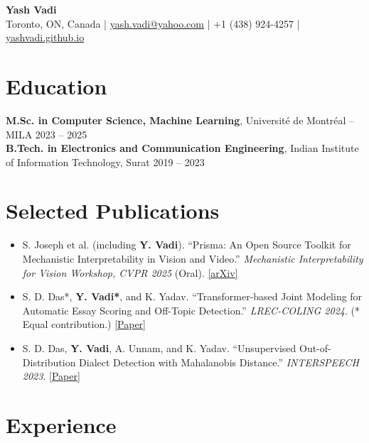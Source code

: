 \documentclass[letterpaper,10pt]{article}
\newcommand{\pub}[1]{\item\small #1}
\begin{document}
\small

\begin{center}
  {\LARGE\textbf{Yash Vadi}}\\[3pt]
  Toronto, ON, Canada \;|\;
  \href{mailto:yash.vadi@yahoo.com}{\textcolor{NavyBlue}{yash.vadi@yahoo.com}} \;|\;
  +1 (438) 924-4257 \;|\;
  \href{https://yashvadi.github.io/}{\textcolor{NavyBlue}{yashvadi.github.io}}
\end{center}
\vspace{-8pt}

\section{Education}
\textbf{M.Sc. in Computer Science, Machine Learning}, Universit\'e de Montr\'eal -- MILA \hfill 2023 -- 2025\\
\textbf{B.Tech. in Electronics and Communication Engineering}, Indian Institute of Information Technology, Surat \hfill 2019 -- 2023

\section{Selected Publications}
\begin{itemize}
  \pub{S. Joseph et al. (including \textbf{Y. Vadi}). ``Prisma: An Open Source Toolkit for Mechanistic Interpretability in Vision and Video.'' \textit{Mechanistic Interpretability for Vision Workshop, CVPR 2025} (Oral). \href{https://arxiv.org/abs/2504.19475}{[arXiv]}}
  \pub{S. D. Das*, \textbf{Y. Vadi*}, and K. Yadav. ``Transformer-based Joint Modeling for Automatic Essay Scoring and Off-Topic Detection.'' \textit{LREC-COLING 2024}. (* Equal contribution.) \href{https://aclanthology.org/2024.lrec-main.1457/}{[Paper]}}
  \pub{S. D. Das, \textbf{Y. Vadi}, A. Unnam, and K. Yadav. ``Unsupervised Out-of-Distribution Dialect Detection with Mahalanobis Distance.'' \textit{INTERSPEECH 2023}. \href{https://www.isca-archive.org/interspeech_2023/das23_interspeech.html}{[Paper]}}
\end{itemize}

\section{Experience}
\end{document}
